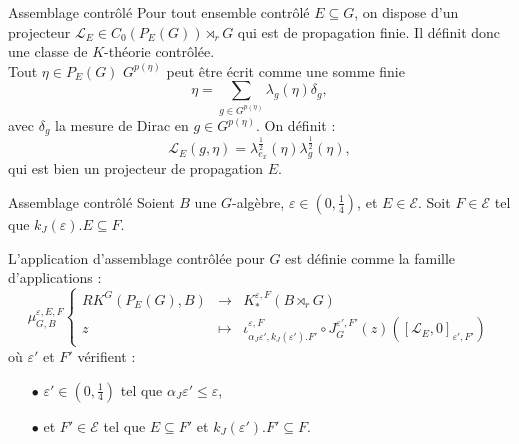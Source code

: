 \begin{frame}{Assemblage contrôlé}
Pour tout ensemble contrôlé $E\subseteq G$, on dispose d'un projecteur $\mathcal L_E\in C_0(P_E(G))\rtimes_r G$ qui est de propagation finie. Il définit donc une classe de $K$-théorie contrôlée.\\
\vspace{0.3 cm}
Tout $\eta\in P_E(G)$  $G^{p(\eta)}$ peut être écrit comme une somme finie 
\[\eta = \sum_{g\in G^{p(\eta)}}\lambda_g(\eta)\delta_g,\]
avec $\delta_g$ la mesure de Dirac en $g\in G^{p(\eta)}$. On définit :
\[\mathcal L_E(g,\eta) = \lambda_{e_x}^{\frac{1}{2}}(\eta)\lambda_g^{\frac{1}{2}}(\eta),\] 
qui est bien un projecteur  de propagation $E$.
\end{frame}

\begin{frame}{Assemblage contrôlé}
Soient $B$ une $G$-algèbre, $\varepsilon\in (0,\frac{1}{4})$, et $E\in\mathcal E$. Soit $F\in \mathcal E$ tel que $k_J(\varepsilon).E \subseteq F$. 
\begin{definitionfr}
L'application d'assemblage contrôlée pour $G$ est définie comme la famille d'applications :
\[\mu_{G,B}^{\varepsilon,E,F}\left\{
\begin{array}{rcl}
RK^G(P_E(G), B) & \rightarrow & K_*^{\varepsilon, F}(B\rtimes_r G)\\
z & \mapsto & \iota_{\alpha_J\varepsilon', k_J(\varepsilon').F'}^{\varepsilon,F} \circ J_G^{\varepsilon', F'}(z)([\mathcal L_E,0]_{\varepsilon' , F'})
\end{array}\right.\]
où $\varepsilon'$ et $F'$ vérifient :
\begin{itemize}
\item[$\bullet$] $\varepsilon'\in (0,\frac{1}{4})$ tel que $\alpha_J \varepsilon'\leq \varepsilon$,
\item[$\bullet$] et $F'\in\mathcal E$ tel que $E\subseteq F'$ et $k_J(\varepsilon').F'\subseteq F$.
\end{itemize}
\end{definitionfr}
\end{frame}

